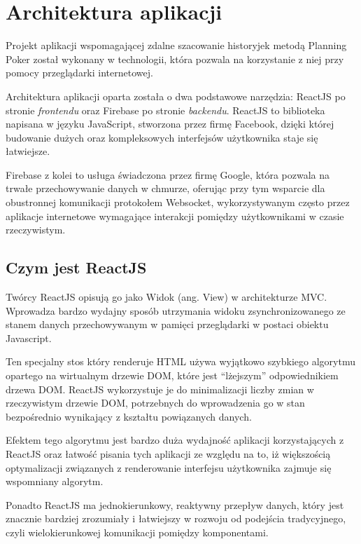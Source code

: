 
\chapter{Architektura aplikacji}

Projekt aplikacji wspomagającej zdalne szacowanie historyjek metodą Planning Poker
został wykonany w technologii, która pozwala na korzystanie z niej przy pomocy przeglądarki internetowej.

Architektura aplikacji oparta została o dwa podstawowe narzędzia:
ReactJS po stronie \textit{frontendu} oraz Firebase po stronie \textit{backendu}.
ReactJS to biblioteka napisana w języku JavaScript, stworzona przez firmę Facebook,
dzięki której budowanie dużych oraz kompleksowych interfejsów użytkownika staje się łatwiejsze.

Firebase z kolei to usługa świadczona przez firmę Google, która
pozwala na trwałe przechowywanie danych w chmurze, oferując przy tym
wsparcie dla obustronnej komunikacji protokołem Websocket, wykorzystywanym często
przez aplikacje internetowe wymagające interakcji pomiędzy użytkownikami w czasie rzeczywistym.

\section{Czym jest ReactJS}

Twórcy ReactJS opisują go jako Widok (ang. View) w architekturze MVC\@.
Wprowadza bardzo wydajny sposób utrzymania widoku zsynchronizowanego ze stanem danych
przechowywanym w pamięci przeglądarki w postaci obiektu Javascript.

Ten specjalny stos który renderuje HTML używa wyjątkowo szybkiego algorytmu opartego na wirtualnym drzewie DOM,
które jest ``lżejszym'' odpowiednikiem drzewa DOM\@. ReactJS wykorzystuje je
do minimalizacji liczby zmian w rzeczywistym drzewie DOM, potrzebnych do wprowadzenia go
w stan bezpośrednio wynikający z kształtu powiązanych danych.

Efektem tego algorytmu jest bardzo duża wydajność aplikacji korzystających z ReactJS oraz
łatwość pisania tych aplikacji ze względu na to, iż większością optymalizacji związanych
z renderowanie interfejsu użytkownika zajmuje się wspomniany algorytm.

Ponadto ReactJS ma jednokierunkowy, reaktywny przepływ danych,
który jest znacznie bardziej zrozumiały i łatwiejszy w rozwoju od podejścia tradycyjnego,
czyli wielokierunkowej komunikacji pomiędzy komponentami.

